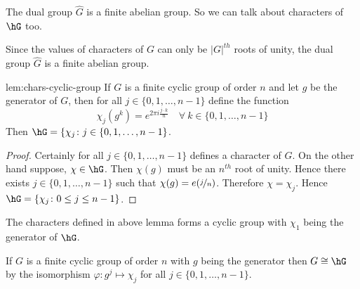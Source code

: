 \begin{observation}
  The dual group $\widehat{G}$ is a finite abelian group. So we can talk about characters of $\hG$ too.
\end{observation}
Since the values of characters of $G$ can only be $|G|^{th}$ roots of unity, the dual group $\widehat{G}$ is a finite abelian group.
\begin{lemma}{}{lem:chars-cyclic-group}
  If $G$ is a finite cyclic group of order $n$ and let $g$ be the generator of $G$, then for all $j\in\{0,1,\dots, n-1\}$ define the function $$\chi_j(g^k)=e^{2\pi i\frac{j\cdot k}{n}} \quad \forall\ k\in \{0,1,\dots, n-1\}$$Then $\hG=\{\chi_j\colon j\in\{0,1,\dots, n-1\}$.
\end{lemma}
\begin{proof}
  Certainly for all $j\in\{0,1,\dots, n-1\}$ defines a character of $G$. On the other hand suppose, $\chi\in\hG$. Then $\chi(g)$ must be an $n^{th}$ root of unity. Hence there exists $j\in\{0,1,\dots, n-1\}$ such that $\chi(g)=e(\nicefrac{j}{n})$. Therefore $\chi=\chi_j$. Hence $\hG=\{\chi_j\colon  0\leq j\leq n-1\}$.
\end{proof}
\begin{observation}
  The characters defined in above lemma forms a cyclic group with $\chi_1$ being the generator of $\hG$.
\end{observation}
\begin{corolary}{}{}
  If $G$ is a finite cyclic group of order $n$ with $g$ being the generator then $G\cong \hG$ by the isomorphism $\varphi:g^j\mapsto \chi_j$ for all $j\in\{0,1,\dots, n-1\}$.
\end{corolary}

